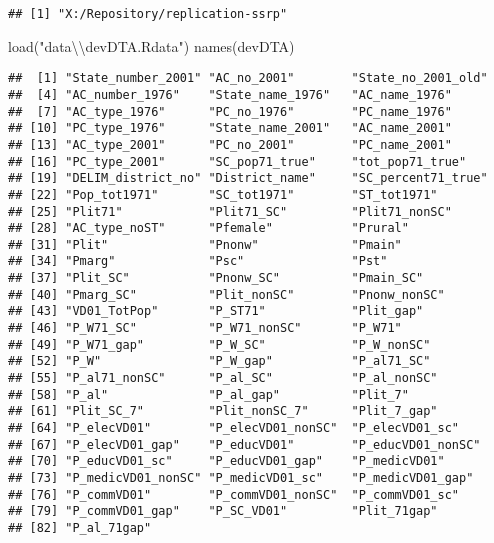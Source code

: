 \documentclass[
]{article}
\newenvironment{Shaded}{\begin{snugshade}}{\end{snugshade}}
\newcommand{\FunctionTok}[1]{\textcolor[rgb]{0.00,0.00,0.00}{#1}}
\newcommand{\NormalTok}[1]{#1}
\newcommand{\SpecialCharTok}[1]{\textcolor[rgb]{0.00,0.00,0.00}{#1}}
\newcommand{\StringTok}[1]{\textcolor[rgb]{0.31,0.60,0.02}{#1}}
\begin{document}
\begin{verbatim}
## [1] "X:/Repository/replication-ssrp"
\end{verbatim}

\begin{Shaded}
\begin{Highlighting}[]
\FunctionTok{load}\NormalTok{(}\StringTok{"data}\SpecialCharTok{\textbackslash{}\textbackslash{}}\StringTok{devDTA.Rdata"}\NormalTok{)}
\FunctionTok{names}\NormalTok{(devDTA)}
\end{Highlighting}
\end{Shaded}

\begin{verbatim}
##  [1] "State_number_2001" "AC_no_2001"        "State_no_2001_old"
##  [4] "AC_number_1976"    "State_name_1976"   "AC_name_1976"     
##  [7] "AC_type_1976"      "PC_no_1976"        "PC_name_1976"     
## [10] "PC_type_1976"      "State_name_2001"   "AC_name_2001"     
## [13] "AC_type_2001"      "PC_no_2001"        "PC_name_2001"     
## [16] "PC_type_2001"      "SC_pop71_true"     "tot_pop71_true"   
## [19] "DELIM_district_no" "District_name"     "SC_percent71_true"
## [22] "Pop_tot1971"       "SC_tot1971"        "ST_tot1971"       
## [25] "Plit71"            "Plit71_SC"         "Plit71_nonSC"     
## [28] "AC_type_noST"      "Pfemale"           "Prural"           
## [31] "Plit"              "Pnonw"             "Pmain"            
## [34] "Pmarg"             "Psc"               "Pst"              
## [37] "Plit_SC"           "Pnonw_SC"          "Pmain_SC"         
## [40] "Pmarg_SC"          "Plit_nonSC"        "Pnonw_nonSC"      
## [43] "VD01_TotPop"       "P_ST71"            "Plit_gap"         
## [46] "P_W71_SC"          "P_W71_nonSC"       "P_W71"            
## [49] "P_W71_gap"         "P_W_SC"            "P_W_nonSC"        
## [52] "P_W"               "P_W_gap"           "P_al71_SC"        
## [55] "P_al71_nonSC"      "P_al_SC"           "P_al_nonSC"       
## [58] "P_al"              "P_al_gap"          "Plit_7"           
## [61] "Plit_SC_7"         "Plit_nonSC_7"      "Plit_7_gap"       
## [64] "P_elecVD01"        "P_elecVD01_nonSC"  "P_elecVD01_sc"    
## [67] "P_elecVD01_gap"    "P_educVD01"        "P_educVD01_nonSC" 
## [70] "P_educVD01_sc"     "P_educVD01_gap"    "P_medicVD01"      
## [73] "P_medicVD01_nonSC" "P_medicVD01_sc"    "P_medicVD01_gap"  
## [76] "P_commVD01"        "P_commVD01_nonSC"  "P_commVD01_sc"    
## [79] "P_commVD01_gap"    "P_SC_VD01"         "Plit_71gap"       
## [82] "P_al_71gap"
\end{verbatim}
\end{document}
